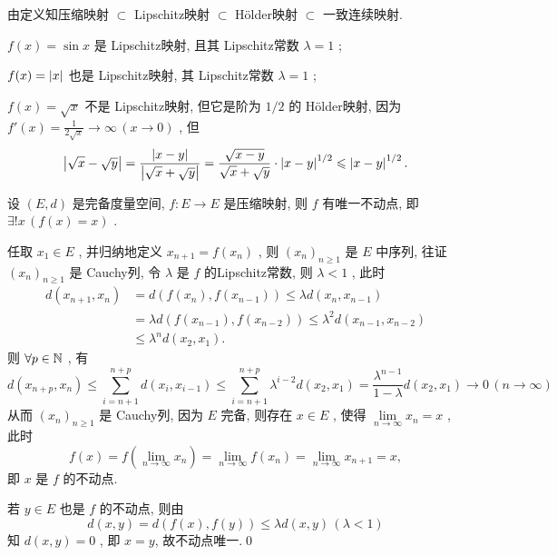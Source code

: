 \begin{Remark}
	由定义知压缩映射 $ \subset $ Lipschitz映射 $ \subset $ H\"older映射 $ \subset $ 一致连续映射.
\end{Remark}

\begin{Example}
	$ f(x)=\sin x $ 是 Lipschitz映射, 且其 Lipschitz常数 $ \lambda=1 $ ;

	$ f(x)=\left| x \right|  $ 也是 Lipschitz映射, 其 Lipschitz常数 $ \lambda=1 $ ;

	$ f(x)=\sqrt{x} $ 不是 Lipschitz映射, 但它是阶为 $ 1/2 $ 的 H\"older映射, 因为 $ f'(x)=\frac{1}{2\sqrt{x}}\to\infty\,(x\to 0) $ , 但
	\[
		\left| \sqrt{x}-\sqrt{y} \right| =\frac{\left| x-y \right| }{\left| \sqrt{x}+\sqrt{y} \right| }=\frac{\sqrt{x-y}}{\sqrt{x}+\sqrt{y}}\cdot\left| x-y \right| ^{1/2}\leqslant\left| x-y \right| ^{1/2}.
	\]
\end{Example}

\begin{Theorem}[压缩映照原理]\label{thm:压缩映照原理}
	设 $ (E, d) $ 是完备度量空间,  $ f:E\to E $ 是压缩映射, 则 $ f $ 有唯一不动点, 即 $ \exists!x\,(f(x)=x) $ .
\end{Theorem}

\begin{Proof}
	任取 $ x_{1}\in E $ , 并归纳地定义 $ x_{n+1}=f(x_{n}) $ , 则 $ (x_{n})_{n\geqslant1} $ 是 $ E $ 中序列, 往证 $ (x_{n})_{n\geqslant1} $ 是 Cauchy列, 令 $ \lambda $ 是 $ f $ 的Lipschitz常数, 则 $ \lambda<1 $ , 此时
	\[
		\begin{aligned}
			d(x_{n+1}, x_{n}) & = d(f(x_{n}), f(x_{n-1})) \leqslant \lambda d(x_{n}, x_{n-1})               \\
			                  & =\lambda d(f(x_{n-1}), f(x_{n-2}))\leqslant \lambda^{2} d(x_{n-1}, x_{n-2}) \\
			                  & \leqslant \lambda^{n} d(x_{2}, x_{1}).
		\end{aligned}
	\]
	则 $ \forall p\in \mathbb{N} $ , 有
	\[
		d(x_{n+p}, x_{n})\leqslant\sum_{i=n+1}^{n+p}d(x_{i}, x_{i-1})\leqslant\sum_{i=n+1}^{n+p}\lambda^{i-2}d(x_{2}, x_{1})=\frac{\lambda^{n-1}}{1-\lambda}d(x_{2}, x_{1})\to 0\,(n\to\infty)
	\]
	从而 $ (x_{n})_{n\geqslant1} $ 是 Cauchy列, 因为 $ E $ 完备, 则存在 $ x\in E $ , 使得 $ \lim\limits_{n\to \infty}x_{n}=x $ , 此时
	\[
		f(x)=f(\lim_{n\to\infty}x_{n})=\lim_{n\to\infty}f(x_{n})=\lim_{n\to\infty}x_{n+1}=x,
	\]
	即 $ x $ 是 $ f $ 的不动点.

	若 $ y\in E $ 也是 $ f $ 的不动点, 则由
	\[
		d(x, y)=d(f(x), f(y))\leqslant\lambda d(x, y)\,(\lambda<1)
	\]
	知 $ d(x, y)=0 $ , 即 $ x=y $, 故不动点唯一.\qed
\end{Proof}




